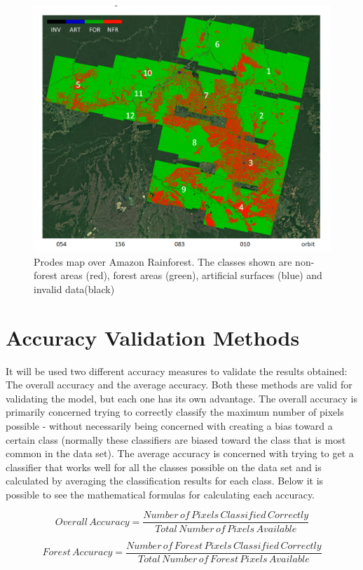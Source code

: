 \begin{figure}[H]
    \centering
    \includegraphics[width=0.7\linewidth]{Cap3/Rondonia.png}
    \caption{Prodes map over Amazon Rainforest. The classes shown are non-forest areas (red), forest areas (green), artificial surfaces (blue) and invalid data(black)}
    \label{fig:rondonia}
\end{figure}

\section{Accuracy Validation Methods}
It will be used two different accuracy measures to validate the results obtained: The overall accuracy and the average accuracy. Both these methods are valid for validating the model, but each one has its own advantage. The overall accuracy is primarily concerned trying to correctly classify the maximum number of pixels possible - without necessarily being concerned with creating a bias toward a certain class (normally these classifiers are biased toward the class that is most common in the data set). The average accuracy is concerned with trying to get a classifier that works well for all the classes possible on the data set and is calculated by averaging the classification results for each class. Below it is possible to see the mathematical formulas for calculating each accuracy.

\begin{equation}
    Overall\,Accuracy = \frac{Number\,of\,Pixels\,Classified\,Correctly}{Total\,Number\,of\,Pixels\, Available}
\end{equation}

\begin{equation}
    Forest\,Accuracy = \frac{Number\,of\,Forest\,Pixels\,Classified\,Correctly}{Total\,Number\,of\,Forest\,Pixels\, Available}
\end{equation}

